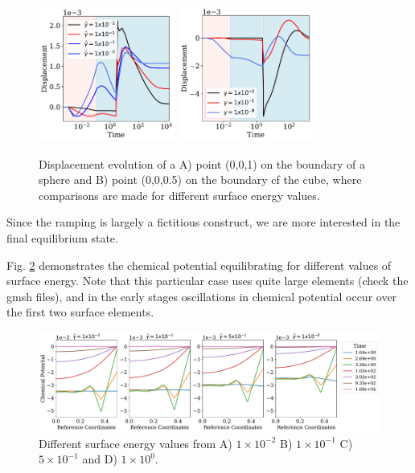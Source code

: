 \documentclass[12pt,3p]{article}
\numberwithin{equation}{section}
\begin{document}
\begin{figure}[!htb]
\centering
\includegraphics[width=0.4\textwidth]{../Images/SphereDispEvoGv}
\includegraphics[width=0.39\textwidth]{../Images/CubeFreeDispEvoGv}
\caption{Displacement evolution of a A) point (0,0,1) on the boundary of a sphere and B) point (0,0,0.5) on the boundary cf the cube, where comparisons are made for different surface energy values. }
\label{FigDispEvo}
\end{figure}
Since the ramping is largely a fictitious construct, we are more interested in the final equilibrium state. 

\newpage 

Fig. \ref{FigSphereChemEvo} demonstrates the chemical potential equilibrating for different values of surface energy. Note that this particular case uses quite large elements (check the gmsh files), and in the early stages oscillations in chemical potential occur over the first two surface elements. 

\begin{figure}[!htb]
\centering
\includegraphics[width=\textwidth]{../Images/SphereChemEvoGv}
\caption{Different surface energy values from A) $1 \times 10^{-2}$ B) $1 \times 10^{-1}$ C) $5 \times 10^{-1}$ and D) $1 \times 10^{0}$. }
\label{FigSphereChemEvo}
\end{figure}
\end{document}
